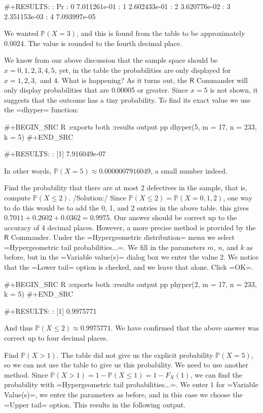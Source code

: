 {#+RESULTS:
:             Pr
: 0 7.011261e-01
: 1 2.602433e-01
: 2 3.620776e-02
: 3 2.351153e-03
: 4 7.093997e-05

We wanted \(\mathbb{P}(X=3)\), and this is found from the table to be
approximately 0.0024. The value is rounded to the fourth decimal
place.

We know from our above discussion that the sample space should be
\(x=0,1,2,3,4,5\), yet, in the table the probabilities are only
displayed for \(x = 1,2,3,\) and 4. What is happening? As it turns
out, the \(\mathsf{R}\) Commander will only display probabilities that
are 0.00005 or greater. Since \(x=5\) is not shown, it suggests that
the outcome has a tiny probability. To find its exact value we use the
=dhyper= function:

#+BEGIN_SRC R :exports both :results output pp  
dhyper(5, m = 17, n = 233, k = 5)
#+END_SRC

#+RESULTS:
: [1] 7.916049e-07

In other words, \(\mathbb{P}(X=5)\approx0.0000007916049\), a small
number indeed.

Find the probability that there are at most 2 defectives in the
sample, that is, compute \(\mathbb{P}(X\leq2)\).  /Solution:/ Since
\(\mathbb{P}(X\leq2)=\mathbb{P}(X=0,1,2)\), one way to do this would
be to add the 0, 1, and 2 entries in the above table. this gives
\(0.7011+0.2602+0.0362=0.9975\). Our answer should be correct up to
the accuracy of 4 decimal places. However, a more precise method is
provided by the \(\mathsf{R}\) Commander. Under the =Hypergeometric
distribution= menu we select =Hypergeometric tail
probabilities...=. We fill in the parameters \(m\), \(n\), and \(k\)
as before, but in the =Variable value(s)= dialog box we enter the
value 2. We notice that the =Lower tail= option is checked, and we
leave that alone. Click =OK=.

#+BEGIN_SRC R :exports both :results output pp  
phyper(2, m = 17, n = 233, k = 5)
#+END_SRC

#+RESULTS:
: [1] 0.9975771

And thus \(\mathbb{P}(X\leq2)\approx 0.9975771\). We have confirmed
that the above answer was correct up to four decimal places.

Find \(\mathbb{P}(X>1)\). The table did not give us the explicit
probability \(\mathbb{P}(X=5)\), so we can not use the table to give
us this probability. We need to use another method. Since
\(\mathbb{P}(X>1)=1-\mathbb{P}(X\leq1)=1-F_{X}(1)\), we can find the
probability with =Hypergeometric tail probabilities...=. We enter 1
for =Variable Value(s)=, we enter the parameters as before, and in
this case we choose the =Upper tail= option. This results in the
following output.

}
